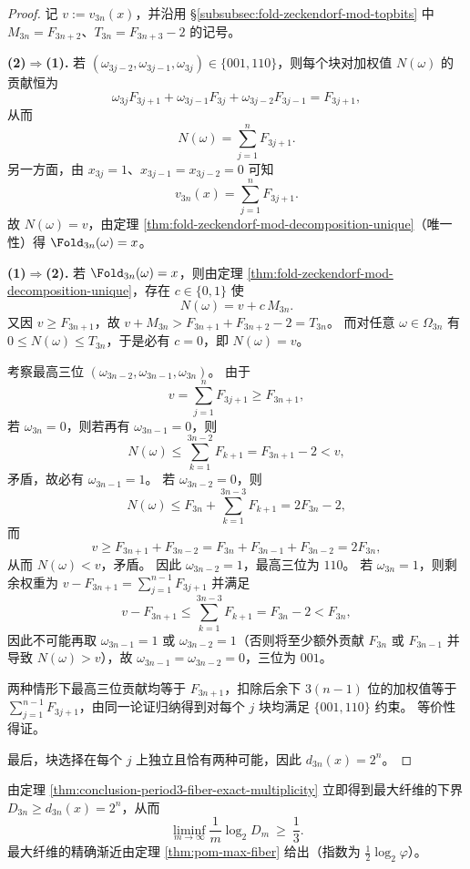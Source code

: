 \begin{proof}
记 \(v:=v_{3n}(x)\)，并沿用 \S\ref{subsubsec:fold-zeckendorf-mod-topbits} 中 \(M_{3n}=F_{3n+2}\)、\(T_{3n}=F_{3n+3}-2\) 的记号。
\par
\textbf{(2)\(\Rightarrow\)(1).}
若 \((\omega_{3j-2},\omega_{3j-1},\omega_{3j})\in\{001,110\}\)，则每个块对加权值 \(N(\omega)\) 的贡献恒为
\[
\omega_{3j}F_{3j+1}+\omega_{3j-1}F_{3j}+\omega_{3j-2}F_{3j-1}=F_{3j+1},
\]
从而
\[
N(\omega)=\sum_{j=1}^{n}F_{3j+1}.
\]
另一方面，由 \(x_{3j}=1\)、\(x_{3j-1}=x_{3j-2}=0\) 可知
\[
v_{3n}(x)=\sum_{j=1}^{n}F_{3j+1}.
\]
故 \(N(\omega)=v\)，由定理 \ref{thm:fold-zeckendorf-mod-decomposition-unique}（唯一性）得 \(\Fold_{3n}(\omega)=x\)。
\par
\textbf{(1)\(\Rightarrow\)(2).}
若 \(\Fold_{3n}(\omega)=x\)，则由定理 \ref{thm:fold-zeckendorf-mod-decomposition-unique}，存在 \(c\in\{0,1\}\) 使
\[
N(\omega)=v+c\,M_{3n}.
\]
又因 \(v\ge F_{3n+1}\)，故 \(v+M_{3n}>F_{3n+1}+F_{3n+2}-2=T_{3n}\)。
而对任意 \(\omega\in\Omega_{3n}\) 有 \(0\le N(\omega)\le T_{3n}\)，于是必有 \(c=0\)，即 \(N(\omega)=v\)。
\par
考察最高三位 \((\omega_{3n-2},\omega_{3n-1},\omega_{3n})\)。
由于
\[
v=\sum_{j=1}^n F_{3j+1}\ge F_{3n+1},
\]
若 \(\omega_{3n}=0\)，则若再有 \(\omega_{3n-1}=0\)，则
\[
N(\omega)\le \sum_{k=1}^{3n-2}F_{k+1}=F_{3n+1}-2<v,
\]
矛盾，故必有 \(\omega_{3n-1}=1\)。
若 \(\omega_{3n-2}=0\)，则
\[
N(\omega)\le F_{3n}+\sum_{k=1}^{3n-3}F_{k+1}=2F_{3n}-2,
\]
而
\[
v\ge F_{3n+1}+F_{3n-2}=F_{3n}+F_{3n-1}+F_{3n-2}=2F_{3n},
\]
从而 \(N(\omega)<v\)，矛盾。
因此 \(\omega_{3n-2}=1\)，最高三位为 \(110\)。
若 \(\omega_{3n}=1\)，则剩余权重为
\(
v-F_{3n+1}=\sum_{j=1}^{n-1}F_{3j+1}
\)
并满足
\[
v-F_{3n+1}\le \sum_{k=1}^{3n-3}F_{k+1}=F_{3n}-2<F_{3n},
\]
因此不可能再取 \(\omega_{3n-1}=1\) 或 \(\omega_{3n-2}=1\)（否则将至少额外贡献 \(F_{3n}\) 或 \(F_{3n-1}\) 并导致 \(N(\omega)>v\)），故 \(\omega_{3n-1}=\omega_{3n-2}=0\)，三位为 \(001\)。
\par
两种情形下最高三位贡献均等于 \(F_{3n+1}\)，扣除后余下 \(3(n-1)\) 位的加权值等于 \(\sum_{j=1}^{n-1}F_{3j+1}\)，由同一论证归纳得到对每个 \(j\) 块均满足 \(\{001,110\}\) 约束。
等价性得证。
\par
最后，块选择在每个 \(j\) 上独立且恰有两种可能，因此 \(d_{3n}(x)=2^n\)。
\end{proof}

\begin{remark}[周期三纤维的指数下界]\label{rem:conclusion-period3-fiber-exponent-lb}
由定理 \ref{thm:conclusion-period3-fiber-exact-multiplicity} 立即得到最大纤维的下界
\(
D_{3n}\ge d_{3n}(x)=2^n
\)，从而
\[
\liminf_{m\to\infty}\frac{1}{m}\log_2 D_m\ \ge\ \frac13.
\]
最大纤维的精确渐近由定理 \ref{thm:pom-max-fiber} 给出（指数为 \(\tfrac12\log_2\varphi\)）。
\end{remark}


